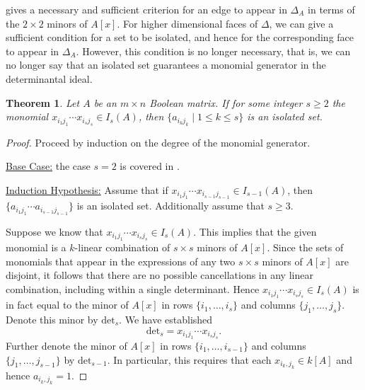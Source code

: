 \documentclass[11pt,letterpaper, reqno]{amsart}
\newtheorem{theorem}{Theorem}[section]
\theoremstyle{definition}
\theoremstyle{remark}
\numberwithin{equation}{section}
\begin{document}
 gives a necessary and sufficient criterion for  an edge to appear in $\Delta_A$ in terms of the $2\times 2$ minors of $A[x]$. For higher dimensional faces of $\Delta$, we can give a sufficient condition for a set to be isolated, and hence for the corresponding  face to appear in $\Delta_A$. However, this condition is no longer necessary, that is, we can no longer say that an isolated set guarantees a monomial generator in the determinantal ideal. 

\begin{theorem}\label{thm: monomials=isolated}
        Let $A$ be an $m\times n$ Boolean matrix. If for some integer $s\geq 2$ the monomial $x_{i_1 j_1}\cdots x_{i_sj_s}\in I_s(A)$, then  $\{a_{i_k j_k}\mid 1\leq k\leq s\}$ is an isolated set.
\end{theorem}
\begin{proof}
Proceed by induction on the degree of the monomial generator. 

\noindent \underline{Base Case:} the case $s=2$ is covered in .

\noindent \underline{Induction Hypothesis:} Assume that if $x_{i_1 j_1}\cdots x_{i_{s-1}j_{s-1}}\in I_{s-1}(A)$, then $\{a_{i_1 j_1}\cdots a_{i_{s-1}j_{s-1}}\}$ is an isolated set. Additionally assume that $s\geq 3$.

Suppose we know that $x_{i_1 j_1}\cdots x_{i_sj_s}\in I_s(A)$. This implies that the given monomial is a $k$-linear combination of $s\times s$ minors of $A[x]$. Since the sets of monomials that appear in the expressions of any two $s\times s$ minors of $A[x]$ are disjoint, it follows that there are no possible cancellations in any linear combination, including within a single determinant. Hence $x_{i_1 j_1}\cdots x_{i_sj_s}\in I_s(A)$ is in fact equal to the minor of $A[x]$ in rows $\{i_1, \ldots, i_s\}$ and columns $\{j_1, \ldots, j_s\}$. Denote this minor by $\text{det}_s$. 
We have established
\[
\text{det}_s = x_{i_1 j_1}\cdots x_{i_sj_s}.
\]
Further denote the minor of $A[x]$ in rows $\{i_1, \ldots, i_{s-1}\}$ and columns $\{j_1, \ldots, j_{s-1}\}$ by $\text{det}_{s-1}$.
In particular, this requires that each $x_{i_k,j_k} \in k[A]$ and hence $a_{i_k,j_k}=1$.


\end{proof}
\end{document}
